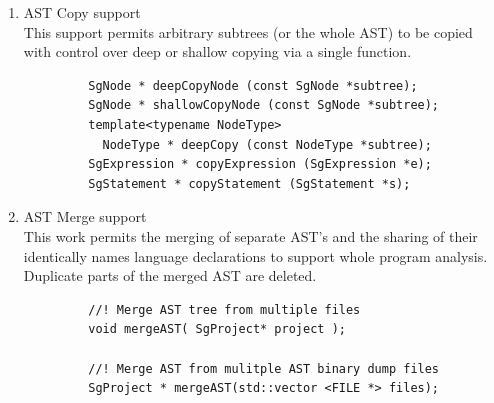 \begin{enumerate}
\begin{enumerate}
\begin{lstlisting}
       ...
       void replaceExpression (SgExpression *oldExp, SgExpression *newExp, 
            bool keepOldExp=false);
       void replaceStatement (SgStatement *oldStmt, SgStatement *newStmt, 
            bool movePreprocessinInfo=false);
       
       void moveStatementsBetweenBlocks (SgBasicBlock *sourceBlock, 
            SgBasicBlock *targetBlock);
       \end{lstlisting}
       \item AST Copy support \\
         This support permits arbitrary subtrees (or the whole AST) to be copied
         with control over deep or shallow copying via a single function.
         \begin{lstlisting}
         SgNode * deepCopyNode (const SgNode *subtree);
         SgNode * shallowCopyNode (const SgNode *subtree);
         template<typename NodeType>
           NodeType * deepCopy (const NodeType *subtree);
         SgExpression * copyExpression (SgExpression *e);
         SgStatement * copyStatement (SgStatement *s);
         \end{lstlisting}

       \item AST Merge support \\
           This work permits the merging of separate AST's and the sharing of their
           identically names language declarations to support whole program
           analysis. Duplicate parts of the merged AST are deleted.
         \begin{lstlisting}
         //! Merge AST tree from multiple files
         void mergeAST( SgProject* project );

         //! Merge AST from mulitple AST binary dump files
         SgProject * mergeAST(std::vector <FILE *> files);
         \end{lstlisting}


       \end{enumerate} %
   \end{enumerate}  %

